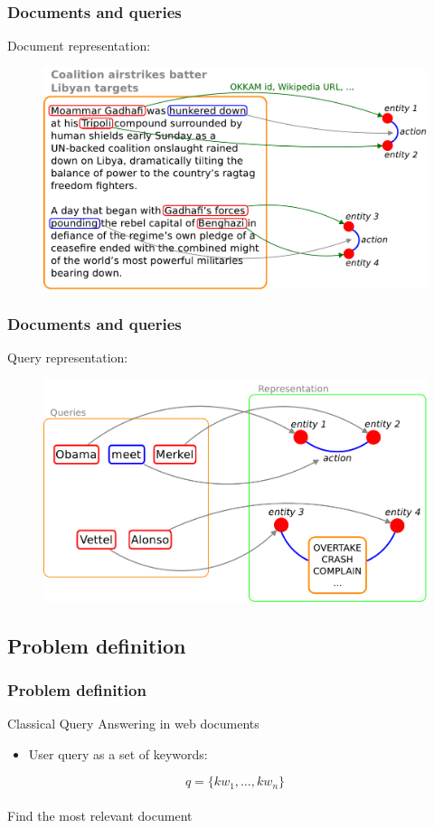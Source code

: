 \documentclass{beamer}
\begin{document}
\begin{frame}
\frametitle{Documents and queries}
Document representation:\\
\begin{figure}
\includegraphics[scale=0.37]{imgs/docsrep}
\end{figure}
\end{frame}

\begin{frame}
\frametitle{Documents and queries}
Query representation:\\
\begin{figure}
\includegraphics[scale=0.37]{imgs/qryrep}
\end{figure}
\bigskip
\end{frame}

\subsection{Problem definition}

\begin{frame}
\frametitle{Problem definition}
Classical Query Answering in web documents\\
\begin{itemize}
\item User query as a set of keywords:
\end{itemize}
\bigskip
\begin{equation*}
q = \{kw_{1}, \dots, kw_{n}\}
\end{equation*}
\\
\bigskip
Find the most relevant document
\end{frame}
\end{document}
